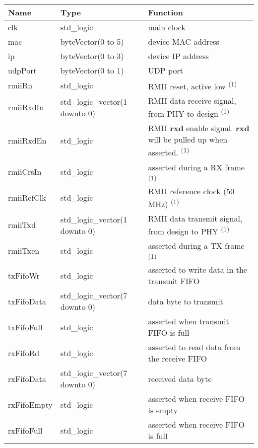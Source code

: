 \documentclass[a4paper]{hitec}
\newcommand{\signal}[1]{\textbf{#1}}
\begin{document}
\ \\
\begin{tabularx}{\linewidth}{llX}
	\hline
	Name & Type & Function \\
	\hline
	clk              & std\_logic                      & main clock \\
	mac              & byteVector(0 to 5)              & device MAC address \\
	ip               & byteVector(0 to 3)              & device IP address \\
	udpPort          & byteVector(0 to 1)              & UDP port \\
	rmiiRn           & std\_logic                      & RMII reset, active low \textsuperscript{(1)} \\
	rmiiRxdIn        & std\_logic\_vector(1 downto 0)  & RMII data receive signal, from PHY to design  \textsuperscript{(1)} \\
	rmiiRxdEn        & std\_logic                      & RMII \signal{rxd} enable signal. \signal{rxd} will be pulled up when asserted. \textsuperscript{(1)} \\
	rmiiCrsIn        & std\_logic                      & asserted during a RX frame \textsuperscript{(1)} \\
	rmiiRefClk       & std\_logic                      & RMII reference clock (50 MHz) \textsuperscript{(1)} \\
	rmiiTxd          & std\_logic\_vector(1 downto 0)  & RMII data transmit signal, from design to PHY \textsuperscript{(1)} \\
	rmiiTxen         & std\_logic                      & asserted during a TX frame \textsuperscript{(1)} \\
	txFifoWr         & std\_logic                      & asserted to write data in the transmit FIFO \\
	txFifoData       & std\_logic\_vector(7 downto 0)  & data byte to transmit \\
	txFifoFull       & std\_logic                      & asserted when transmit FIFO is full \\
	rxFifoRd         & std\_logic                      & asserted to read data from the receive FIFO \\
	rxFifoData       & std\_logic\_vector(7 downto 0)  & received data byte \\
	rxFifoEmpty      & std\_logic                      & asserted when receive FIFO is empty \\
	rxFifoFull       & std\_logic                      & asserted when receive FIFO is full \\
\end{tabularx}
\end{document}
